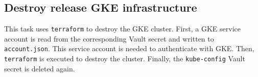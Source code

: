 \subsection{Destroy release GKE infrastructure}\label{subsec:destroy-release-gke-infrastructure}

This task uses \verb|terraform| to destroy the GKE cluster.
First, a GKE service account is read from the corresponding Vault secret and written to \verb|account.json|.
This service account is needed to authenticate with GKE.
Then, \verb|terraform| is executed to destroy the cluster.
Finally, the \verb|kube-config| Vault secret is deleted again.
